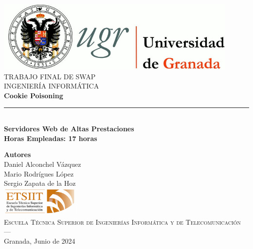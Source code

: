\begin{titlepage}
 
 
\newlength{\centeroffset}
\setlength{\centeroffset}{-0.5\oddsidemargin}
\addtolength{\centeroffset}{0.5\evensidemargin}
\thispagestyle{empty}

\noindent\hspace*{\centeroffset}\begin{minipage}{\textwidth}

\centering
\includegraphics[width=0.9\textwidth]{imagenes/logo_ugr.jpg}\\[1.4cm]

\textsc{ \Large TRABAJO FINAL DE SWAP\\[0.2cm]}
\textsc{ INGENIERÍA INFORMÁTICA}\\[1cm]
% 
{\Huge\bfseries Cookie Poisoning\\
}
\noindent\rule[-1ex]{\textwidth}{3pt}\\[3.5ex]
{\large\bfseries Servidores Web de Altas Prestaciones} \\
{\large\bfseries Horas Empleadas: 17 horas}
\end{minipage}

\vspace{2.5cm}
\noindent\hspace*{\centeroffset}\begin{minipage}{\textwidth}
\centering

\textbf{Autores}\\ {Daniel Alconchel Vázquez \\
Mario Rodrígues López \\
Sergio Zapata de la Hoz}\\[2.5ex]

\includegraphics[width=0.3\textwidth]{imagenes/etsiit_logo.png}\\[0.1cm]
\textsc{Escuela Técnica Superior de Ingenierías Informática y de Telecomunicación}\\
\textsc{---}\\
Granada, Junio de 2024
\end{minipage}
\end{titlepage}


